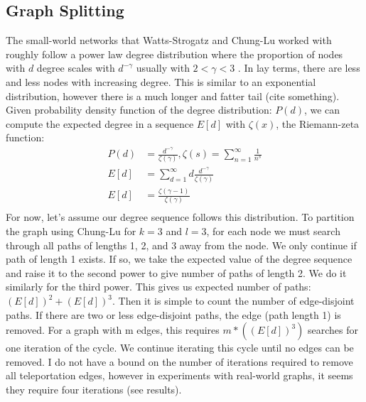 \documentclass{article}
\begin{document}
\subsection{Graph Splitting}
The small-world networks that Watts-Strogatz and Chung-Lu worked with roughly follow a power law degree distribution where the proportion of nodes with $d$ degree scales with $d^{-\gamma}$ usually with $2 < \gamma < 3$ \cite{Chung:2004,Watts:1998}. In lay terms, there are less and less nodes with increasing degree. This is similar to an exponential distribution, however there is a much longer and fatter tail (cite something). Given probability density function of the degree distribution: $P(d)$, we can compute the expected degree in a sequence $E[d]$ with $\zeta(x)$, the Riemann-zeta function:\\
\begin{align*}
P(d) & = \frac{d^{-\gamma}}{\zeta(\gamma)},               \zeta(s) = \sum_{n=1}^{\infty} \frac{1}{n^s}\\
E[d] & = \sum_{d=1}^{\infty} d \frac{d^{-\gamma}}{\zeta(\gamma)} \\
E[d] & = \frac{\zeta(\gamma-1)}{\zeta(\gamma)}\\ 
\end{align*}
For now, let's assume our degree sequence follows this distribution. To partition the graph using Chung-Lu for $k = 3$ and $l = 3$, for each node we must search through all paths of lengths 1, 2, and 3 away from the node. We only continue if path of length 1 exists. If so, we take the expected value of the degree sequence and raise it to the second power to give number of paths of length 2. We do it similarly for the third power. This gives us expected number of paths: $(E[d])^{2}+(E[d])^{3}$. Then it is simple to count the number of edge-disjoint paths. If there are two or less edge-disjoint paths, the edge (path length 1) is removed. For a graph with m edges, this requires $m*((E[d])^{3})$ searches for one iteration of the cycle. We continue iterating this cycle until no edges can be removed. I do not have a bound on the number of iterations required to remove all teleportation edges, however in experiments with real-world graphs, it seems they require four iterations (see results).
\end{document}
